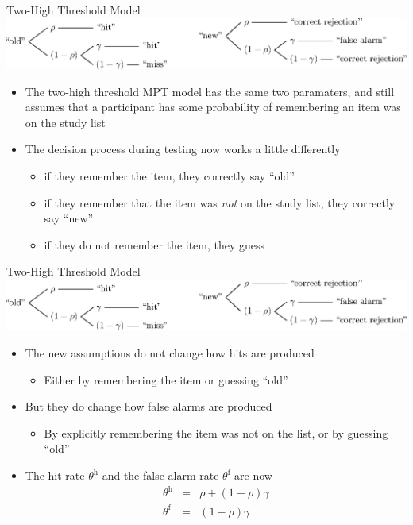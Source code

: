 \documentclass[10pt]{beamer}
\begin{document}
\begin{frame}[fragile]{Two-High Threshold Model}
	\includegraphics[width = \textwidth]{twoHighThreshold.eps}
	\vspace{0.5em}
	\begin{itemize}
		\item The two-high threshold MPT model has the same two paramaters, and still assumes that a participant has some probability of remembering an item was on the study list
		\item The decision process during testing now works a little differently
		      \begin{itemize}
			      \item if they remember the item, they correctly say ``old''
			      \item if they remember that the item was \emph{not} on the study list, they correctly say ``new''
			      \item if they do not remember the item, they guess
		      \end{itemize}
	\end{itemize}
\end{frame}

\begin{frame}[fragile]{Two-High Threshold Model}
	\includegraphics[width = \textwidth]{twoHighThreshold.eps}
	\vspace{0.5em}
	\begin{itemize}
		\item The new assumptions do not change how hits are produced
		      \begin{itemize}
			      \item Either by remembering the item or guessing ``old''
		      \end{itemize}
		\item But they do change how false alarms are produced
		      \begin{itemize}
			      \item By explicitly remembering the item was not on the list, or by guessing ``old''
		      \end{itemize}
		\item The hit rate $\theta^\mathrm{h}$ and the false alarm rate $\theta^\mathrm{f}$ are now
		      \begin{eqnarray}
			      \theta^\mathrm{h} &=& \rho + \left(1-\rho\right)\gamma \nonumber\\
			      \theta^\mathrm{f} &=& \left(1-\rho\right)\gamma \nonumber
		      \end{eqnarray}
	\end{itemize}
\end{frame}
\end{document}
